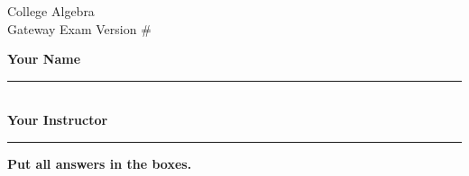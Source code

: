 \documentclass{article}
\begin{document}
\begin{center}
    \large{College Algebra} \\      %
    \vspace{-1ex}
    \normalsize{
        Gateway Exam 
        \hspace*{6em} 
        Version \# %
    } 
\end{center}

\vspace*{-3ex}

\begin{flushright}
    \bf{Your Name}
    \rule{2.5in}{.4pt}\\
    \bf{Your Instructor}
    \rule{2.5in}{.4pt}
\end{flushright}

\vspace*{-6ex}

\bf{Put all answers in the boxes.}\\

\vspace*{-1ex}
\end{document}
